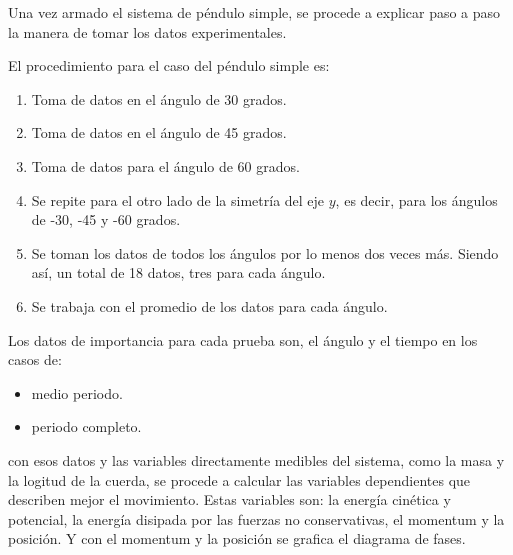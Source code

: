 \documentclass[aps,twocolumn,secnumarabic,nobalancelastpage,amsmath,amssymb,nofootinbib]{revtex4-1}
\begin{document}
			Una vez armado el sistema de p\'endulo simple, se procede a explicar paso a paso la manera de tomar los datos experimentales.
			
			
			El procedimiento para el caso del p\'endulo simple es:
			\begin{enumerate}
				\item Toma de datos en el \'angulo de 30 grados.
				\item Toma de datos en el \'angulo de 45 grados.
				\item Toma de datos para el \'angulo de 60 grados.
				\item Se repite para el otro lado de la simetr\'ia del eje $y$, es decir, para los \'angulos de -30, -45 y -60 grados.
				\item Se toman los datos de todos los \'angulos por lo menos dos veces m\'as. Siendo as\'i, un total de 18 datos, tres para cada \'angulo. 
				\item Se trabaja con el promedio de los datos para cada \'angulo.   
			\end{enumerate}  	
			Los datos de importancia para cada prueba son, el \'angulo y el tiempo en los casos de:  
			\begin{itemize}
				\item medio periodo.
				\item periodo completo.
			\end{itemize}
			con esos datos y las variables directamente medibles del sistema, como la masa y la logitud de la cuerda, se procede a calcular las variables dependientes que describen mejor el movimiento. Estas variables son: la energ\'ia cin\'etica y potencial, la energ\'ia disipada por las fuerzas no conservativas, el momentum y la posici\'on. Y con el momentum y la posici\'on se grafica el diagrama de fases.   
\end{document}
